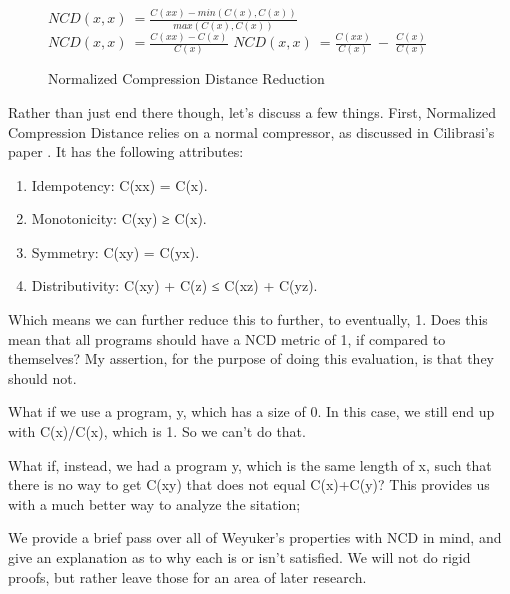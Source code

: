 \documentclass[]{article}
\begin{document}
\begin{figure}[h]
	\caption{Normalized Compression Distance Reduction}
	\label{ncd_reduction}
	\centering
	$NCD(x,x) ~= \frac{C(xx) - min(C(x),C(x))}{max(C(x),C(x))}$
	$NCD(x,x) ~= \frac{C(xx) - C(x)}{C(x)}$
	$NCD(x,x) ~= \frac{C(xx)}{C(x)} ~- ~\frac{C(x)}{C(x)}$
\end{figure}


Rather than just end there though, let's discuss a few things.
First, Normalized Compression Distance relies on a normal compressor, as discussed in Cilibrasi's paper \cite{ref:cilibrasi2005clustering}.
It has the following attributes:
\begin{enumerate}
	\item Idempotency: C(xx) = C(x).
	\item Monotonicity: C(xy) ≥ C(x).
	\item Symmetry: C(xy) = C(yx).
	\item Distributivity: C(xy) + C(z) ≤ C(xz) + C(yz).
\end{enumerate}

Which means we can further reduce this to further, to eventually, 1.
Does this mean that all programs should have a NCD metric of 1, if compared to themselves?
My assertion, for the purpose of doing this evaluation, is that they should not.

What if we use a program, y, which has a size of 0.
In this case, we still end up with C(x)/C(x), which is 1.
So we can't do that.

What if, instead, we had a program y, which is the same length of x, such that there is no way to get C(xy) that does not equal C(x)+C(y)?
This provides us with a much better way to analyze the sitation; 


We provide a brief pass over all of Weyuker's properties with NCD in mind, and give an explanation as to why each is or isn't satisfied. 
We will not do rigid proofs, but rather leave those for an area of later research.
\end{document}
